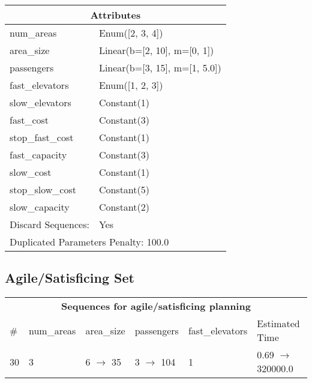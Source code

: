 \documentclass{article}
\begin{document}
                    \begin{center}
                    \begin{tabular}{@{}p{}p{}@{}}
                    \multicolumn{2}{c}{\bf \large Attributes}\\\midrule
                    num\_areas & Enum([2, 3, 4])\\
area\_size & Linear(b=[2, 10], m=[0, 1])\\
passengers & Linear(b=[3, 15], m=[1, 5.0])\\
fast\_elevators & Enum([1, 2, 3])\\
slow\_elevators & Constant(1)\\
fast\_cost & Constant(3)\\
stop\_fast\_cost & Constant(1)\\
fast\_capacity & Constant(3)\\
slow\_cost & Constant(1)\\
stop\_slow\_cost & Constant(5)\\
slow\_capacity & Constant(2)
                    
                    
                                \\\midrule
                                Discard Sequences: & Yes
                             \\\midrule
                    \multicolumn{2}{l}{Duplicated Parameters Penalty: 100.0}
                    \end{tabular}
                    \end{center}
                
                         \subsection*{Agile/Satisficing Set}

                        \begin{center}
                        \begin{tabular}{@{}l|l|l|l|l|l@{}}
                        \multicolumn{6}{c}{\bf \large Sequences for agile/satisficing planning}\\
                        \# & num\_areas & area\_size & passengers & fast\_elevators & Estimated Time\\\midrule
                        30&3&6 $\rightarrow$ 35&3 $\rightarrow$ 104&1&0.69 $\rightarrow$ 320000.0
                        \end{tabular}
                        \end{center}
                    
\end{document}
